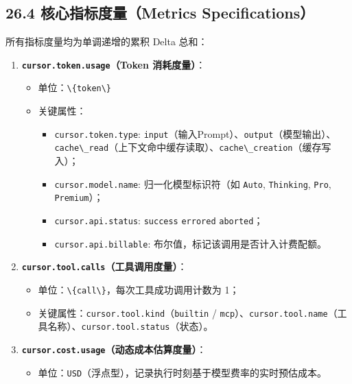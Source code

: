 \documentclass[10.5pt,a4paper,oneside]{report}
\providecommand{\tightlist}{\setlength{\itemsep}{0pt}\setlength{\parskip}{0pt}}
\newcommand{\passthrough}[1]{#1}
\begin{document}
\subsection{26.4 核心指标度量（Metrics
Specifications）}\label{ux6838ux5fc3ux6307ux6807ux5ea6ux91cfmetrics-specifications}

所有指标度量均为单调递增的累积 Delta 总和：

\begin{enumerate}
\def\labelenumi{\arabic{enumi}.}
\tightlist
\item
  \textbf{\passthrough{\lstinline!cursor.token.usage!}（Token
  消耗度量）}：

  \begin{itemize}
  \tightlist
  \item
    单位：\passthrough{\lstinline!\{token\}!}
  \item
    关键属性：

    \begin{itemize}
    \tightlist
    \item
      \passthrough{\lstinline!cursor.token.type!}:
      \passthrough{\lstinline!input!}（输入Prompt）、\passthrough{\lstinline!output!}（模型输出）、\passthrough{\lstinline!cache\_read!}（上下文命中缓存读取）、\passthrough{\lstinline!cache\_creation!}（缓存写入）；
    \item
      \passthrough{\lstinline!cursor.model.name!}: 归一化模型标识符（如
      \passthrough{\lstinline!Auto!},
      \passthrough{\lstinline!Thinking!}, \passthrough{\lstinline!Pro!},
      \passthrough{\lstinline!Premium!}）；
    \item
      \passthrough{\lstinline!cursor.api.status!}:
      \passthrough{\lstinline!success!} \textbar{}
      \passthrough{\lstinline!errored!} \textbar{}
      \passthrough{\lstinline!aborted!}；
    \item
      \passthrough{\lstinline!cursor.api.billable!}:
      布尔值，标记该调用是否计入计费配额。
    \end{itemize}
  \end{itemize}
\item
  \textbf{\passthrough{\lstinline!cursor.tool.calls!}（工具调用度量）}：

  \begin{itemize}
  \tightlist
  \item
    单位：\passthrough{\lstinline!\{call\}!}，每次工具成功调用计数为 1；
  \item
    关键属性：\passthrough{\lstinline!cursor.tool.kind!}（\passthrough{\lstinline!builtin!}
    /
    \passthrough{\lstinline!mcp!}）、\passthrough{\lstinline!cursor.tool.name!}（工具名称）、\passthrough{\lstinline!cursor.tool.status!}（状态）。
  \end{itemize}
\item
  \textbf{\passthrough{\lstinline!cursor.cost.usage!}（动态成本估算度量）}：

  \begin{itemize}
  \tightlist
  \item
    单位：\passthrough{\lstinline!USD!}（浮点型），记录执行时刻基于模型费率的实时预估成本。
  \end{itemize}
\end{enumerate}
\end{document}
